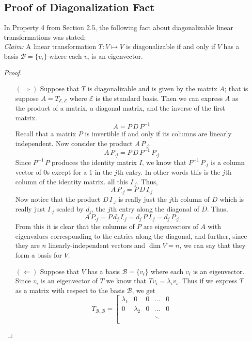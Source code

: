 \documentclass[10pt]{article}
\newcommand{\mcb}{\mathcal{B}}
\newcommand{\mce}{\mathcal{E}}
\begin{document}
\subsection{Proof of Diagonalization Fact}
In Property 4 from Section 2.5, the following fact about diagonalizable linear transformations was stated:\vspace{0.5cm}\\
\textit{Claim:} A linear transformation $T:V\mapsto V$ is diagonalizable if and only if $V$ has a basis $\mcb = \{v_i\}$ where each $v_i$ is an eigenvector.
\begin{proof}
\text{}
\begin{enumerate}
    \item[$(\Longrightarrow)$] Suppose that $T$ is diagonalizable and is given by the matrix $A$; that is suppose $A= T_{\mce,\mce}$ where $\mce$ is the standard basis. Then we can express $A$ as the product of a matrix, a diagonal matrix, and the inverse of the first matrix.
    \[A = P\,D\, P^{-1}\]
    Recall that a matrix $P$ is invertible if and only if its columns are linearly independent. Now consider the product $A\,P_{\cdot j}$.
    \[A\,P_{\cdot j} = P\,D\, P^{-1}\, P_{\cdot j}\]
    Since $P^{-1}\, P$ produces the identity matrix $I$, we know that $P^{-1}\, P_{\cdot j}$ is a column vector of 0s except for a 1 in the $j$th entry. In other words this is the $j$th column of the identity matrix. all this $I_{\cdot j}$. Thus,
    \[A\,P_{\cdot j} = P\,D\, I_{\cdot j}\]
    Now notice that the product $D\,I_{\cdot j}$ is really just the $j$th column of $D$ which is really just $I_{\cdot j}$ scaled by $d_j$, the $j$th entry along the diagonal of $D$. Thus,
    \[A\,P_{\cdot j} = P\,d_j\,I_{\cdot j} = d_j \,P\,I_{\cdot j}=d_j\,P_{\cdot j}\]
    From this it is clear that the columns of $P$ are eigenvectors of $A$ with eigenvalues corresponding to the entries along the diagonal, and further, since they are $n$ linearly-independent vectors and $\dim V=n$, we can say that they form a basis for $V$.
    \item[$(\Longleftarrow)$] Suppose that $V$ has a basis $\mcb = \{v_i\}$ where each $v_i$ is an eigenvector. Since $v_i$ is an eigenvector of $T$ we know that $Tv_i = \lambda_i v_i$. Thus if we express $T$ as a matrix with respect to the basis $\mcb$, we get
    \[T_{\mcb,\mcb} = \left[\begin{array}{ccccc}
        \lambda_1 & 0&0 &\dots&0 \\
         0& \lambda_2 &0 &\dots &0 \\
         & & & \ddots & \\

\end{array}\]
\end{enumerate}
\end{proof}
\end{document}
